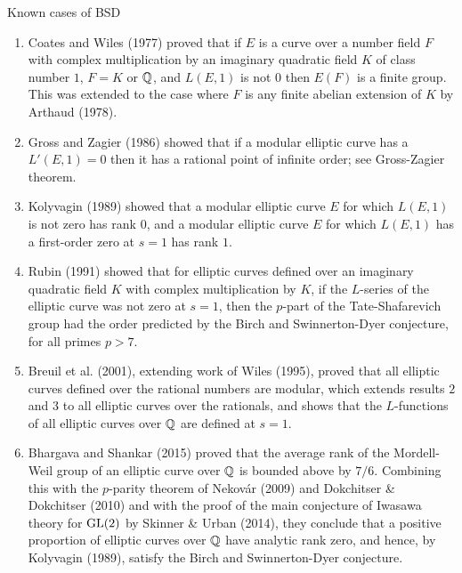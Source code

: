 Known cases of BSD
\begin{enumerate}
\item
Coates and Wiles (1977) proved that if $E$ is a curve over a number field $F$ with complex multiplication by an imaginary quadratic field $K$ of class number $1$, $F = K$ or $\mathbb{Q}$, and $L(E, 1)$ is not $0$ then $E(F)$ is a finite group. This was extended to the case where $F$ is any finite abelian extension of $K$ by Arthaud (1978).
\item
Gross and Zagier (1986) showed that if a modular elliptic curve has a $L'(E, 1)=0$  then it has a rational point of infinite order; see Gross-Zagier theorem.
\item
Kolyvagin (1989) showed that a modular elliptic curve $E$ for which $L(E, 1)$ is not zero has rank $0$, and a modular elliptic curve $E$ for which $L(E, 1)$ has a first-order zero at $s = 1$ has rank $1$.
\item
Rubin (1991) showed that for elliptic curves defined over an imaginary quadratic field $K$ with complex multiplication by $K$, if the $L$-series of the elliptic curve was not zero at $s = 1$, then the $p$-part of the Tate-Shafarevich group had the order predicted by the Birch and Swinnerton-Dyer conjecture, for all primes $p > 7$.
\item
Breuil et al. (2001), extending work of Wiles (1995), proved that all elliptic curves defined over the rational numbers are modular, which extends results $2$ and $3$ to all elliptic curves over the rationals, and shows that the $L$-functions of all elliptic curves over $\mathbb{Q}$ are defined at $s = 1$.
\item
Bhargava and Shankar (2015) proved that the average rank of the Mordell-Weil group of an elliptic curve over $\mathbb{Q}$ is bounded above by $7/6$. Combining this with the $p$-parity theorem of Nekov\'ar (2009) and Dokchitser \& Dokchitser (2010) and with the proof of the main conjecture of Iwasawa theory for ${\rm GL}(2)$ by Skinner \& Urban (2014), they conclude that a positive proportion of elliptic curves over $\mathbb{Q}$ have analytic rank zero, and hence, by Kolyvagin (1989), satisfy the Birch and Swinnerton-Dyer conjecture.
\end{enumerate}



\endinput

Any text after an \endinput is ignored.
You could put scraps here or things in progress.
